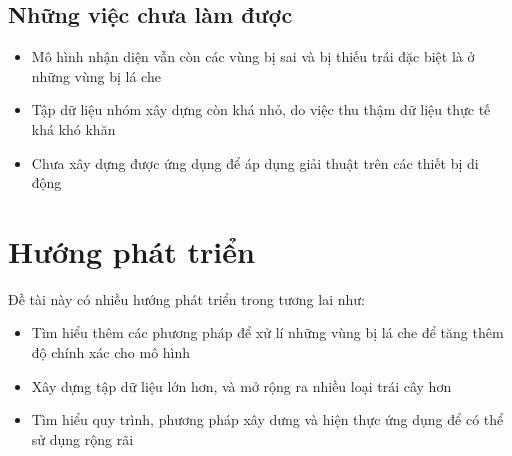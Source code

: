 \subsection{Những việc chưa làm được}
\begin{itemize}
\item Mô hình nhận diện vẫn còn các vùng bị sai và bị thiếu trái đặc biệt là ở những vùng bị lá che
\item Tập dữ liệu nhóm xây dựng còn khá nhỏ, do việc thu thậm dữ liệu thực tế khá khó khăn
\item Chưa xây dựng được ứng dụng để áp dụng giải thuật trên các thiết bị di động
\end{itemize}

\section{Hướng phát triển}
Đề tài này có nhiều hướng phát triển trong tương lai như:
\begin{itemize}
\item Tìm hiểu thêm các phương pháp để xử lí những vùng bị lá che để tăng thêm độ chính xác cho mô hình
\item Xây dựng tập dữ liệu lớn hơn, và mở rộng ra nhiều loại trái cây hơn
\item Tìm hiểu quy trình, phương pháp xây dưng và hiện thực ứng dụng để có thể sử dụng rộng rãi
\end{itemize}
